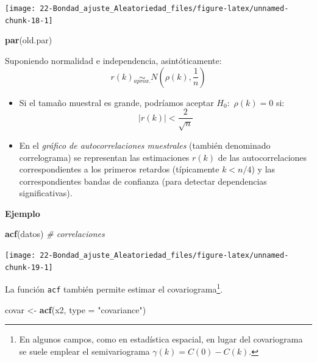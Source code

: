\documentclass[
]{book}
\newenvironment{Shaded}{\begin{snugshade}}{\end{snugshade}}
\newcommand{\CommentTok}[1]{\textcolor[rgb]{0.56,0.35,0.01}{\textit{#1}}}
\newcommand{\DataTypeTok}[1]{\textcolor[rgb]{0.13,0.29,0.53}{#1}}
\newcommand{\KeywordTok}[1]{\textcolor[rgb]{0.13,0.29,0.53}{\textbf{#1}}}
\newcommand{\NormalTok}[1]{#1}
\newcommand{\StringTok}[1]{\textcolor[rgb]{0.31,0.60,0.02}{#1}}
\theoremstyle{break}
\theoremstyle{definition}
\theoremstyle{definition}
\theoremstyle{definition}
\theoremstyle{remark}
\begin{document}
\begin{center}\texttt{[image: 22-Bondad\_ajuste\_Aleatoriedad\_files/figure-latex/unnamed-chunk-18-1]} \end{center}

\begin{Shaded}
\begin{Highlighting}[]
\KeywordTok{par}\NormalTok{(old.par)}
\end{Highlighting}
\end{Shaded}

Suponiendo normalidad e independencia, asintóticamente:
\[r(k)\underset{aprox.}{\sim}N\left(  \rho(k),\frac{1}{n}\right)\]

\begin{itemize}
\item
  Si el tamaño muestral es grande, podríamos aceptar \(H_{0}:\)
  \(\rho\left( k\right) = 0\) si:\[|r(k)|<\dfrac{2}{\sqrt{n}}\]
\item
  En el \emph{gráfico de autocorrelaciones muestrales} (también
  denominado correlograma) se representan las estimaciones \(r(k)\)
  de las autocorrelaciones correspondientes a los primeros retardos
  (típicamente \(k<n/4\)) y las correspondientes bandas de confianza
  (para detectar dependencias significativas).
\end{itemize}

\textbf{Ejemplo}

\begin{Shaded}
\begin{Highlighting}[]
\KeywordTok{acf}\NormalTok{(datos)  }\CommentTok{# correlaciones}
\end{Highlighting}
\end{Shaded}

\begin{center}\texttt{[image: 22-Bondad\_ajuste\_Aleatoriedad\_files/figure-latex/unnamed-chunk-19-1]} \end{center}

La función \texttt{acf} también permite estimar el covariograma\footnote{En algunos campos, como en estadística espacial, en lugar del covariograma se suele emplear el semivariograma \(\gamma(k) = C(0) - C(k)\).}.

\begin{Shaded}
\begin{Highlighting}[]
\NormalTok{covar <-}\StringTok{ }\KeywordTok{acf}\NormalTok{(x2, }\DataTypeTok{type =} \StringTok{"covariance"}\NormalTok{)}
\end{Highlighting}
\end{Shaded}
\end{document}
